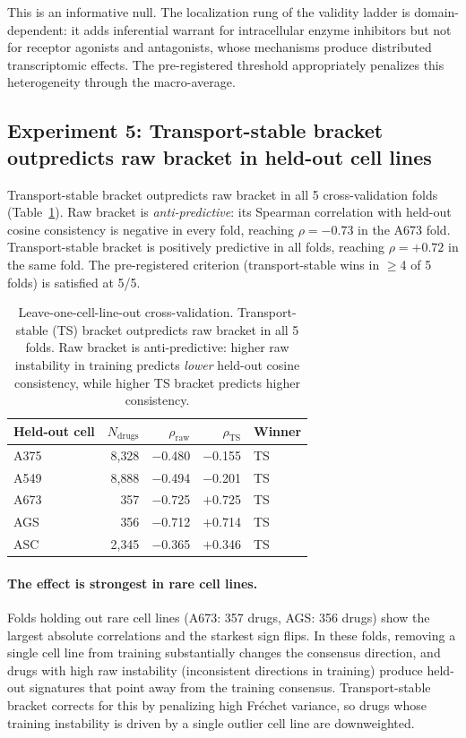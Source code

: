 \documentclass{article}
\begin{document}
This is an informative null. The localization rung of the validity ladder
is domain-dependent: it adds inferential warrant for intracellular enzyme
inhibitors but not for receptor agonists and antagonists, whose mechanisms
produce distributed transcriptomic effects. The pre-registered threshold
appropriately penalizes this heterogeneity through the macro-average.

\subsection{Experiment 5: Transport-stable bracket outpredicts raw bracket in held-out cell lines}

Transport-stable bracket outpredicts raw bracket in all 5 cross-validation
folds (Table~\ref{tab:transport}). Raw bracket is \emph{anti-predictive}:
its Spearman correlation with held-out cosine consistency is negative in
every fold, reaching $\rho = -0.73$ in the A673 fold. Transport-stable
bracket is positively predictive in all folds, reaching $\rho = +0.72$ in
the same fold. The pre-registered criterion (transport-stable wins in
$\geq$4 of 5 folds) is satisfied at 5/5.

\begin{table}[t]
\centering
\caption{Leave-one-cell-line-out cross-validation. Transport-stable (TS)
bracket outpredicts raw bracket in all 5 folds. Raw bracket is
anti-predictive: higher raw instability in training predicts \emph{lower}
held-out cosine consistency, while higher TS bracket predicts higher
consistency.}
\label{tab:transport}
\small
\begin{tabular}{lrrrl}
\toprule
Held-out cell & $N_{\text{drugs}}$ & $\rho_{\text{raw}}$ & $\rho_{\text{TS}}$ & Winner \\
\midrule
A375 & 8{,}328 & $-$0.480 & $-$0.155 & TS \\
A549 & 8{,}888 & $-$0.494 & $-$0.201 & TS \\
A673 & 357 & $-$0.725 & $+$0.725 & TS \\
AGS & 356 & $-$0.712 & $+$0.714 & TS \\
ASC & 2{,}345 & $-$0.365 & $+$0.346 & TS \\
\bottomrule
\end{tabular}
\end{table}

\paragraph{The effect is strongest in rare cell lines.}
Folds holding out rare cell lines (A673: 357 drugs, AGS: 356 drugs) show
the largest absolute correlations and the starkest sign flips. In these
folds, removing a single cell line from training substantially changes the
consensus direction, and drugs with high raw instability (inconsistent
directions in training) produce held-out signatures that point away from
the training consensus. Transport-stable bracket corrects for this by
penalizing high Fr\'{e}chet variance, so drugs whose training instability
is driven by a single outlier cell line are downweighted.
\end{document}
